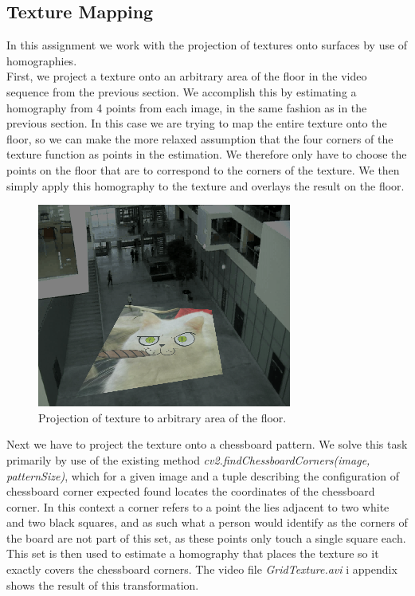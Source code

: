 \subsection{Texture Mapping}
In this assignment we work with the projection of textures onto surfaces by use of homographies.\\
First, we project a texture onto an arbitrary area of the floor in the video sequence from the previous section. We accomplish this by estimating a homography from 4 points from each image, in the same fashion as in the previous section. In this case we are trying to map the entire texture onto the floor, so we can make the more relaxed assumption that the four corners of the texture function as points in the estimation. We therefore only have to choose the points on the floor that are to correspond to the corners of the texture. We then simply apply this homography to the texture and overlays the result on the floor. 
\begin{figure}[h]
	\centering
	\includegraphics[scale=1]{images/texture_simple.png}
	\caption{Projection of texture to arbitrary area of the floor.}
\end{figure}
Next we have to project the texture onto a chessboard pattern. We solve this task primarily by use of the existing method \textsl{cv2.findChessboardCorners(image, patternSize)}, which for a given image and a tuple describing the configuration of chessboard corner expected found locates the coordinates of the chessboard corner. In this context a corner refers to a point the lies adjacent to two white and two black squares, and as such what a person would identify as the corners of the board are not part of this set, as these points only touch a single square each. This set is then used to estimate a homography that places the texture so it exactly covers the chessboard corners. The video file \textsl{GridTexture.avi} i appendix shows the result of this transformation. \\
